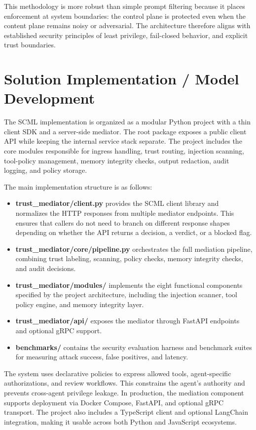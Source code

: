 \documentclass[12pt]{article}
\begin{document}
This methodology is more robust than simple prompt filtering because it places enforcement at system boundaries: the control plane is protected even when the content plane remains noisy or adversarial. The architecture therefore aligns with established security principles of least privilege, fail-closed behavior, and explicit trust boundaries.

\section{Solution Implementation / Model Development}

The SCML implementation is organized as a modular Python project with a thin client SDK and a server-side mediator. The root package exposes a public client API while keeping the internal service stack separate. The project includes the core modules responsible for ingress handling, trust routing, injection scanning, tool-policy management, memory integrity checks, output redaction, audit logging, and policy storage.

The main implementation structure is as follows:

\begin{itemize}
    \item \textbf{trust\_mediator/client.py} provides the SCML client library and normalizes the HTTP responses from multiple mediator endpoints. This ensures that callers do not need to branch on different response shapes depending on whether the API returns a decision, a verdict, or a blocked flag.
    \item \textbf{trust\_mediator/core/pipeline.py} orchestrates the full mediation pipeline, combining trust labeling, scanning, policy checks, memory integrity checks, and audit decisions.
    \item \textbf{trust\_mediator/modules/} implements the eight functional components specified by the project architecture, including the injection scanner, tool policy engine, and memory integrity layer.
    \item \textbf{trust\_mediator/api/} exposes the mediator through FastAPI endpoints and optional gRPC support.
    \item \textbf{benchmarks/} contains the security evaluation harness and benchmark suites for measuring attack success, false positives, and latency.
\end{itemize}

The system uses declarative policies to express allowed tools, agent-specific authorizations, and review workflows. This constrains the agent's authority and prevents cross-agent privilege leakage. In production, the mediation component supports deployment via Docker Compose, FastAPI, and optional gRPC transport. The project also includes a TypeScript client and optional LangChain integration, making it usable across both Python and JavaScript ecosystems.
\end{document}
